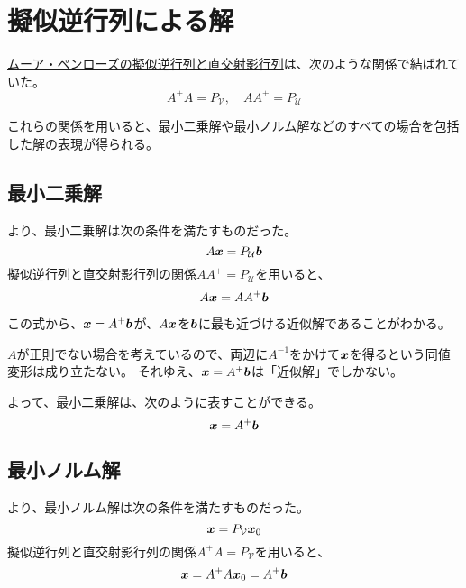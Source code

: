 \documentclass[../../../topic_linear-algebra]{subfiles}
\begin{document}
\sectionline
\section{擬似逆行列による解}

\hyperref[sec:pseudoinverse-projection]{ムーア・ペンローズの擬似逆行列と直交射影行列}は、次のような関係で結ばれていた。
\begin{equation*}
  A^+ A = P_{\mathcal{V}}, \quad A A^+ = P_{\mathcal{U}}
\end{equation*}

これらの関係を用いると、最小二乗解や最小ノルム解などのすべての場合を包括した解の表現が得られる。

\subsection{最小二乗解}

より、最小二乗解は次の条件を満たすものだった。
\begin{equation*}
  A \vb*{x} = P_{\mathcal{U}} \vb*{b}
\end{equation*}
擬似逆行列と直交射影行列の関係$AA^+ = P_{\mathcal{U}}$を用いると、
\begin{equation*}
  A \vb*{x} = A A^+ \vb*{b}
\end{equation*}

この式から、$\vb*{x}=A^+ \vb*{b}$が、$A\vb*{x}$を$\vb*{b}$に最も近づける近似解であることがわかる。

\begin{supplnote}
  $A$が正則でない場合を考えているので、両辺に$A^{-1}$をかけて$\vb*{x}$を得るという同値変形は成り立たない。
  それゆえ、$\vb*{x} = A^+ \vb*{b}$は「近似解」でしかない。
\end{supplnote}

よって、最小二乗解は、次のように表すことができる。
\begin{equation*}
  \vb*{x} = A^+ \vb*{b}
\end{equation*}

\subsection{最小ノルム解}

より、最小ノルム解は次の条件を満たすものだった。
\begin{equation*}
  \vb*{x} = P_{\mathcal{V}} \vb*{x}_0
\end{equation*}
擬似逆行列と直交射影行列の関係$A^+ A = P_{\mathcal{V}}$を用いると、
\begin{equation*}
  \vb*{x} = A^+ A \vb*{x}_0 = A^+ \vb*{b}
\end{equation*}
\end{document}
